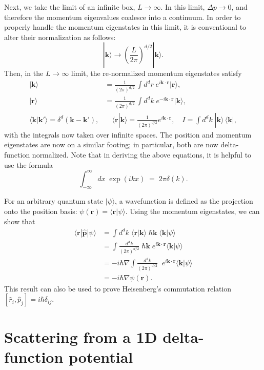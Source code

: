 \documentclass[pra,12pt]{revtex4}
\begin{document}
Next, we take the limit of an infinite box, $L \rightarrow \infty$.
In this limit, $\Delta p \rightarrow 0$, and therefore the momentum
eigenvalues coalesce into a continuum.  In order to properly handle
the momentum eigenstates in this limit, it is conventional to alter
their normalization as follows:
$$|\mathbf{k}\rangle \rightarrow \left(\frac{L}{2\pi}\right)^{d/2} |\mathbf{k}\rangle.$$
Then, in the $L\rightarrow\infty$ limit, the re-normalized momentum
eigenstates satisfy
$$\boxed{\begin{aligned} |\mathbf{k}\rangle &= \frac{1}{(2\pi)^{d/2}} \, \int d^dr \; e^{i\mathbf{k}\cdot\mathbf{r}} |\mathbf{r}\rangle, \\ |\mathbf{r}\rangle &= \frac{1}{(2\pi)^{d/2}} \, \int d^dk \; e^{-i\mathbf{k}\cdot\mathbf{r}} |\mathbf{k}\rangle, \\\langle\mathbf{k}|\mathbf{k}'\rangle = \delta^d(\mathbf{k}-\mathbf{k}'),& \quad \langle\mathbf{r}|\mathbf{k}\rangle = \frac{1}{(2\pi)^{d/2}} e^{i\mathbf{k}\cdot\mathbf{r}}, \quad I = \int d^dk \;|\mathbf{k}\rangle\,\langle\mathbf{k}|,\end{aligned}}$$
with the integrals now taken over infinite spaces.  The position and
momentum eigenstates are now on a similar footing; in particular, both
are now delta-function normalized.  Note that in deriving the above
equations, it is helpful to use the formula
$$\int_{-\infty}^\infty dx\; \exp(ikx) \;=\; 2\pi\delta(k).$$

For an arbitrary quantum state $|\psi\rangle$, a wavefunction is
defined as the projection onto the position basis: $\psi(\mathbf{r}) =
\langle \mathbf{r}|\psi\rangle$.  Using the momentum eigenstates, we can
show that
$$\begin{aligned}\langle \mathbf{r}|\hat{\mathbf{p}}|\psi\rangle &=  \int d^dk \; \langle\mathbf{r}|\mathbf{k}\rangle \; \hbar\mathbf{k} \; \langle\mathbf{k}|\psi\rangle \\ &=  \int \frac{d^dk}{(2\pi)^{d/2}}\; \hbar\mathbf{k} \;e^{i\mathbf{k}\cdot\mathbf{r}} \langle\mathbf{k}|\psi\rangle \\ &=  -i\hbar\nabla \int \frac{d^dk}{(2\pi)^{d/2}}\; \;e^{i\mathbf{k}\cdot\mathbf{r}} \langle\mathbf{k}|\psi\rangle \\ &= -i\hbar \nabla\psi(\mathbf{r}).\end{aligned}$$
This result can also be used to prove Heisenberg's commutation relation
$[\hat{r}_i, \hat{p}_j] = i\hbar\delta_{ij}$.

\section{Scattering from a 1D delta-function potential}
\end{document}
